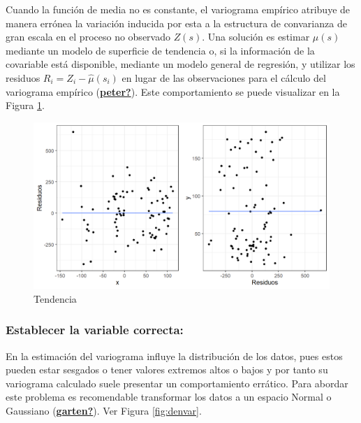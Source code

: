 \documentclass[
]{book}
\begin{document}
Cuando la función de media no es constante, el variograma empírico atribuye de manera errónea la variación inducida por esta a la estructura de convarianza de gran escala en el proceso no observado \(Z(s)\). Una solución es estimar \(\mu(s)\) mediante un modelo de superficie de tendencia o, si la información de la covariable está disponible, mediante un modelo general de regresión, y utilizar los residuos \(R_i=Z_i-\hat{\mu}(s_i)\) en lugar de las observaciones para el cálculo del variograma empírico (\protect\hyperlink{ref-peter}{\textbf{peter?}}). Este comportamiento se puede visualizar en la Figura \ref{fig:rcoordtrend}.

\begin{figure}
\includegraphics[width=17.78in]{figuras/otros/rcoord_trend} \caption{Tendencia}\label{fig:rcoordtrend}
\end{figure}

\hypertarget{establecer-la-variable-correcta}{%
\subsubsection*{Establecer la variable correcta:}\label{establecer-la-variable-correcta}}

En la estimación del variograma influye la distribución de los datos, pues estos pueden estar sesgados o tener valores extremos altos o bajos y por tanto su variograma calculado suele presentar un comportamiento errático. Para abordar este problema es recomendable transformar los datos a un espacio Normal o Gaussiano (\protect\hyperlink{ref-garten}{\textbf{garten?}}). Ver Figura \ref{fig:denvar}.
\end{document}
